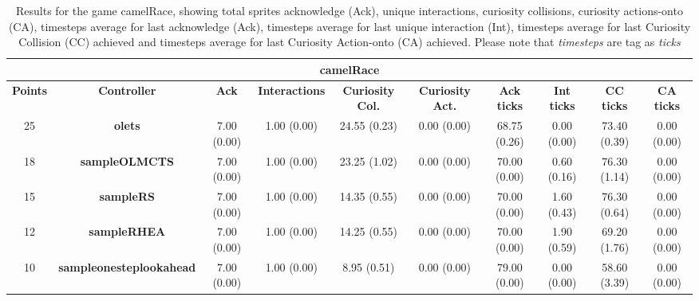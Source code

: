 \begin{table*}[!t]
\begin{center}
\begin{adjustbox}{width=1\textwidth}
\begin{tabular}{|c|c|c|c|c|c|c|c|c|c|}
\multicolumn{10}{c}{\textbf{camelRace}}\\
\hline
\textbf{Points} & \textbf{Controller} & \textbf{Ack} & \textbf{Interactions} & \textbf{Curiosity Col.} & \textbf{Curiosity Act.} & \textbf{Ack ticks} & \textbf{Int ticks} & \textbf{CC ticks} & \textbf{CA ticks}\\
\hline
25 & \textbf{olets} & 7.00 (0.00) & 1.00 (0.00) & 24.55 (0.23) & 0.00 (0.00) & 68.75 (0.26) & 0.00 (0.00) & 73.40 (0.39) & 0.00 (0.00)
 \\
\hline
18 & \textbf{sampleOLMCTS} & 7.00 (0.00) & 1.00 (0.00) & 23.25 (1.02) & 0.00 (0.00) & 70.00 (0.00) & 0.60 (0.16) & 76.30 (1.14) & 0.00 (0.00)
 \\
\hline
15 & \textbf{sampleRS} & 7.00 (0.00) & 1.00 (0.00) & 14.35 (0.55) & 0.00 (0.00) & 70.00 (0.00) & 1.60 (0.43) & 76.30 (0.64) & 0.00 (0.00)
 \\
\hline
12 & \textbf{sampleRHEA} & 7.00 (0.00) & 1.00 (0.00) & 14.25 (0.55) & 0.00 (0.00) & 70.00 (0.00) & 1.90 (0.59) & 69.20 (1.76) & 0.00 (0.00)
 \\
\hline
10 & \textbf{sampleonesteplookahead} & 7.00 (0.00) & 1.00 (0.00) & 8.95 (0.51) & 0.00 (0.00) & 79.00 (0.00) & 0.00 (0.00) & 58.60 (3.39) & 0.00 (0.00)
 \\
\hline
\end{tabular}
\end{adjustbox}
\caption{Results for the game camelRace, showing total sprites acknowledge (Ack), unique interactions, curiosity collisions, curiosity actions-onto (CA), timesteps average for last acknowledge (Ack),  timesteps average for last unique interaction (Int), timesteps average for last Curiosity Collision (CC) achieved and timesteps average for last Curiosity Action-onto (CA) achieved. Please note that \textit{timesteps} are tag as \textit{ticks}}
\label{tab:weights}
\end{center}
\end{table*}
